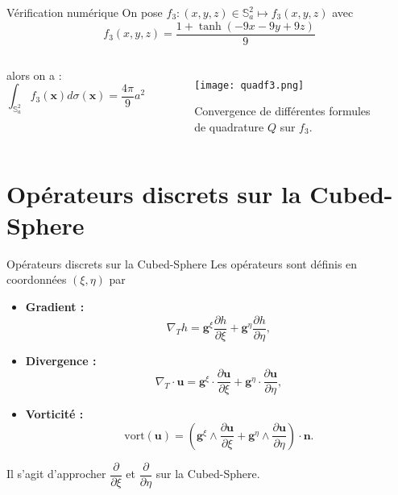 \documentclass[11pt]{beamer}
\def\gint{\displaystyle\int}
\begin{document}
\begin{frame}{Vérification numérique}
On pose $f_3 : (x,y,z) \in \mathbb{S}_a^2 \mapsto
f_3(x,y,z)$ avec
$$
f_3(x,y,z) = \frac{1 + \tanh(-9x-9y+9z)}{9}
$$
\begin{columns}
alors on a :
$$
\gint_{\mathbb{S}_a^2}f_3(\mathbf{x}) d \sigma(\mathbf{x}) = \dfrac{4 \pi}{9} a^2
$$

\begin{figure}
\begin{center}
\texttt{[image: quadf3.png]}
\caption{Convergence de différentes formules de quadrature $Q$ sur $f_3$.}
\end{center}
\end{figure}
\end{columns}
\end{frame}











\section{Opérateurs discrets sur la Cubed-Sphere}
\begin{frame}{Opérateurs discrets sur la Cubed-Sphere}
Les opérateurs sont définis en coordonnées $(\xi,\eta)$ par
\begin{block}{}
\begin{itemize}
\item \textbf{Gradient :}
$$
\nabla_T h = \mathbf{g}^{\xi} \dfrac{\partial h}{\partial \xi} + \mathbf{g}^{\eta} \dfrac{\partial h}{\partial \eta},
$$
\item \textbf{Divergence :}
$$
\nabla_T \cdot \mathbf{u} = \mathbf{g}^{\xi} \cdot \dfrac{\partial \mathbf{u}}{\partial \xi} + \mathbf{g}^{\eta} \cdot \dfrac{\partial \mathbf{u}}{\partial \eta},
$$
\item \textbf{Vorticité :}
$$
\text{vort}(\mathbf{u}) = \left( \mathbf{g}^{\xi} \wedge \dfrac{\partial \mathbf{u}}{\partial \xi} + \mathbf{g}^{\eta} \wedge \dfrac{\partial \mathbf{u}}{\partial \eta} \right) \cdot \mathbf{n}.
$$
\end{itemize}
\end{block}
Il s'agit d'approcher $\dfrac{\partial}{\partial \xi}$ et $\dfrac{\partial}{\partial \eta}$ sur la Cubed-Sphere.
\end{frame}
\end{document}
